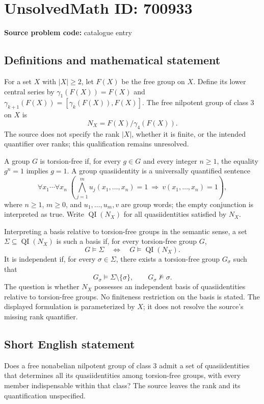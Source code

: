 \documentclass[11pt]{article}
\begin{document}
\section*{UnsolvedMath ID: 700933}
\textbf{Source problem code:} catalogue entry
\subsection{Definitions and mathematical statement}
For a set \(X\) with \(|X|\geq 2\), let \(F(X)\) be the free group on \(X\). Define its lower central series by \(\gamma_1(F(X))=F(X)\) and \(\gamma_{k+1}(F(X))=[\gamma_k(F(X)),F(X)]\). The free nilpotent group of class \(3\) on \(X\) is
\[
N_X=F(X)/\gamma_4(F(X)).
\]
The source does not specify the rank \(|X|\), whether it is finite, or the intended quantifier over ranks; this qualification remains unresolved.

A group \(G\) is torsion-free if, for every \(g\in G\) and every integer \(n\geq 1\), the equality \(g^n=1\) implies \(g=1\). A group quasiidentity is a universally quantified sentence
\[
\forall x_1\cdots\forall x_n\;\left(\bigwedge_{j=1}^{m}u_j(x_1,\ldots,x_n)=1\ \Longrightarrow\ v(x_1,\ldots,x_n)=1\right),
\]
where \(n\geq 1\), \(m\geq 0\), and \(u_1,\ldots,u_m,v\) are group words; the empty conjunction is interpreted as true. Write \(\operatorname{QI}(N_X)\) for all quasiidentities satisfied by \(N_X\).

Interpreting a basis relative to torsion-free groups in the semantic sense, a set \(\Sigma\subseteq\operatorname{QI}(N_X)\) is such a basis if, for every torsion-free group \(G\),
\[
G\models\Sigma\quad\Longleftrightarrow\quad G\models\operatorname{QI}(N_X).
\]
It is independent if, for every \(\sigma\in\Sigma\), there exists a torsion-free group \(G_\sigma\) such that
\[
G_\sigma\models\Sigma\setminus\{\sigma\},
\qquad G_\sigma\not\models\sigma.
\]
The question is whether \(N_X\) possesses an independent basis of quasiidentities relative to torsion-free groups. No finiteness restriction on the basis is stated. The displayed formulation is parameterized by \(X\); it does not resolve the source's missing rank quantifier.
\subsection{Short English statement}
Does a free nonabelian nilpotent group of class \(3\) admit a set of quasiidentities that determines all its quasiidentities among torsion-free groups, with every member indispensable within that class? The source leaves the rank and its quantification unspecified.
\end{document}
